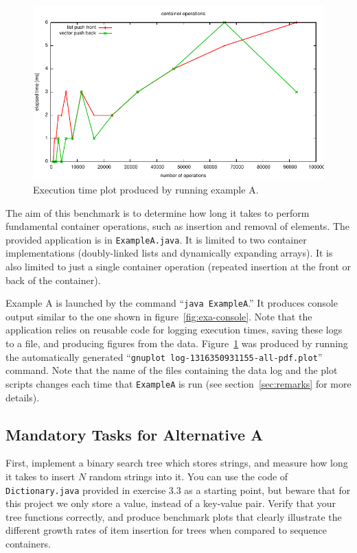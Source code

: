 \documentclass[a4paper,10pt]{article}
\begin{document}
\begin{figure}
  \centering
  \includegraphics[width=0.8\columnwidth]{plot-ExampleA.pdf}
  \caption{
    Execution time plot produced by running example A.
  }\label{fig:exa-plot}
\end{figure}

The aim of this benchmark is to determine how long it takes to perform fundamental container operations, such as insertion and removal of elements.
The provided application is in \texttt{ExampleA.java}.
It is limited to two container implementations (doubly-linked lists and dynamically expanding arrays).
It is also limited to just a single container operation (repeated insertion at the front or back of the container).

Example A is launched by the command ``\texttt{java ExampleA}.''
It produces console output similar to the one shown in figure~\ref{fig:exa-console}.
Note that the application relies on reusable code for logging execution times, saving these logs to a file, and producing figures from the data.
Figure~\ref{fig:exa-plot} was produced by running the automatically generated ``\texttt{gnuplot log-1316350931155-all-pdf.plot}'' command.
Note that the name of the files containing the data log and the plot scripts changes each time that \texttt{ExampleA} is run (see section~\ref{sec:remarks} for more details).



\subsection{Mandatory Tasks for Alternative A}\label{sec:task1a}

First, implement a binary search tree which stores strings, and measure how long it takes to insert $N$ random strings into it.
You can use the code of \texttt{Dictionary.java} provided in exercise 3.3 as a starting point, but beware that for this project we only store a value, instead of a key-value pair.
Verify that your tree functions correctly, and produce benchmark plots that clearly illustrate the different growth rates of item insertion for trees when compared to sequence containers.
\end{document}
